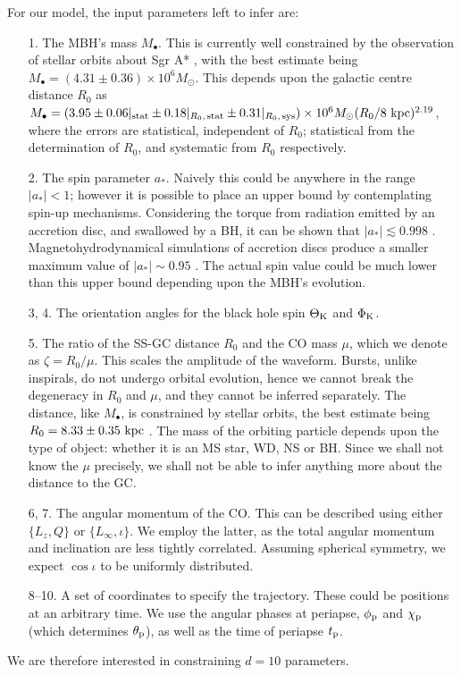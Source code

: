 For our model, the input parameters left to infer are:
\begin{enumerate}[leftmargin=*, widest=\:88--88.]
\item[1.] The MBH's mass $M_\bullet$. This is currently well constrained by the observation of stellar orbits about Sgr A* \citep{Ghez2008, Gillessen2009}, with the best estimate being $M_\bullet = (4.31 \pm 0.36) \times 10^6 M_\odot$. This depends upon the galactic centre distance $R_0$ as $M_\bullet = (3.95 \pm 0.06|_\mathrm{stat} \pm 0.18|_{R_0, \, \mathrm{stat}} \pm  0.31|_{R_0, \, \mathrm{sys}}) \times 10^6 M_\odot (R_0 / 8~\mathrm{kpc})^{2.19}$, where the errors are statistical, independent of $R_0$; statistical from the determination of $R_0$, and systematic from $R_0$ respectively.
\item[2.] The spin parameter $a_\ast$. Naively this could be anywhere in the range $|a_\ast| < 1$; however it is possible to place an upper bound by contemplating spin-up mechanisms. Considering the torque from radiation emitted by an accretion disc, and swallowed by a BH, it can be shown that $|a_\ast| \lesssim 0.998$ \citep{Thorne1974}. Magnetohydrodynamical simulations of accretion discs produce a smaller maximum value of $|a_\ast| \sim 0.95$ \citep{Gammie2004}. The actual spin value could be much lower than this upper bound depending upon the MBH's evolution.
\item[3, 4.] The orientation angles for the black hole spin $\Theta_\mathrm{K}$ and $\Phi_\mathrm{K}$.
\item[5.] The ratio of the SS-GC distance $R_0$ and the CO mass $\mu$, which we denote as $\zeta = R_0/\mu$. This scales the amplitude of the waveform. Bursts, unlike inspirals, do not undergo orbital evolution, hence we cannot break the degeneracy in $R_0$ and $\mu$, and they cannot be inferred separately. The distance, like $M_\bullet$, is constrained by stellar orbits, the best estimate being $R_0 = 8.33 \pm 0.35~\mathrm{kpc}$ \citep{Gillessen2009}. The mass of the orbiting particle depends upon the type of object: whether it is an MS star, WD, NS or BH. Since we shall not know the $\mu$ precisely, we shall not be able to infer anything more about the distance to the GC.
\item[6, 7.] The angular momentum of the CO. This can be described using either $\{L_z, Q\}$ or $\{L_\infty, \iota\}$. We employ the latter, as the total angular momentum and inclination are less tightly correlated. Assuming spherical symmetry, we expect $\cos \iota$ to be uniformly distributed.
\item[8--10.] A set of coordinates to specify the trajectory. These could be positions at an arbitrary time. We use the angular phases at periapse, $\phi_\mathrm{p}$ and $\chi_\mathrm{p}$ (which determines $\theta_\mathrm{p}$), as well as the time of periapse $t_\mathrm{p}$.
\end{enumerate}
We are therefore interested in constraining $d = 10$ parameters.

